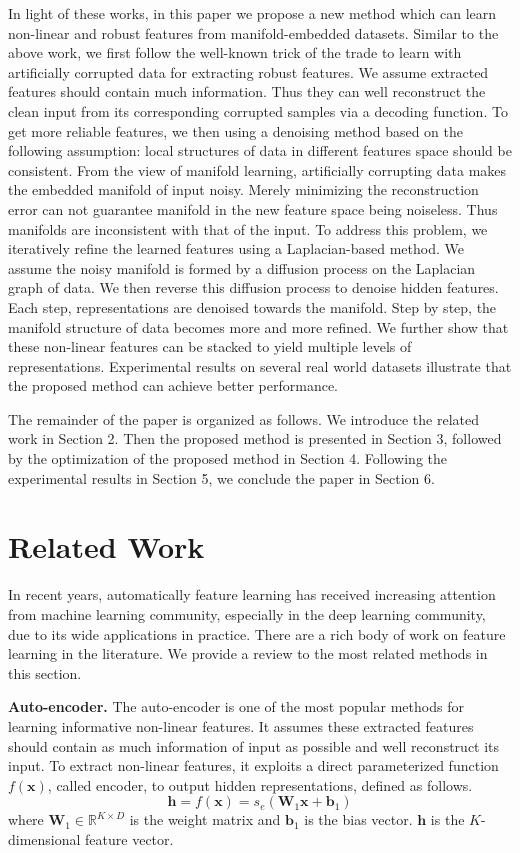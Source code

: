 \documentclass{article}
\def \bb{\mathbf b}
\def \x{\mathbf x}
\def \h{\mathbf h}
\def \W{\mathbf W}
\begin{document}
In light of these works, in this paper we propose a new method which can learn non-linear and robust features from manifold-embedded datasets. Similar to the above work, we first follow the well-known trick of the trade to learn with artificially corrupted data for extracting robust features. We assume extracted features should contain much information. Thus they can well reconstruct the clean input from its corresponding corrupted samples via a decoding function.  To get more reliable features, we then using a denoising method based on the following assumption: local structures of data in different features space should be consistent. From the view of manifold learning, artificially corrupting data makes the embedded manifold of input noisy. Merely minimizing the reconstruction error can not guarantee manifold in the new feature space being noiseless.  Thus manifolds are inconsistent with that of the input. To address this problem, we iteratively refine the learned features using a Laplacian-based method. We assume the noisy manifold is formed by a diffusion process on the Laplacian graph of data. We then reverse this diffusion process to denoise hidden features. Each step, representations are denoised towards the manifold. Step by step, the manifold structure of data becomes more and more refined. We further show that these non-linear features can be stacked to yield multiple levels of representations. Experimental results on several real world datasets illustrate that the proposed method can achieve better performance.

The remainder of the paper is organized as follows. We introduce the related work in Section 2. Then the proposed method  is presented in Section 3, followed by the optimization of the proposed method in Section 4. Following the experimental results in Section 5,  we conclude the paper in Section 6.

\section{Related Work}
In recent years, automatically feature learning has received increasing attention from machine learning community, especially in the deep learning community, due to its wide applications in practice. There are a rich body of work on feature learning in the literature. We provide a review to the most related methods in this section.

\textbf{Auto-encoder.} The auto-encoder is one of the most popular methods for learning informative non-linear features. It assumes these extracted features should contain as much information of input as possible and well reconstruct its input. To extract non-linear features, it exploits a direct parameterized function $f(\x)$, called encoder, to output hidden representations, defined as follows.
\begin{equation}
   \h = f(\x) = s_e(\W_1 \x + \bb_1)
   \label{eq:encoder}
\end{equation}
where $\W_1 \in \mathbb{R}^{K \times D}$ is the weight matrix and $\bb_1$ is the bias vector.  $\h$ is the $K$-dimensional feature vector.
\end{document}
